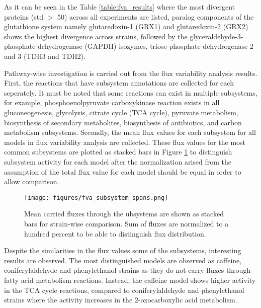   

As it can be seen in the Table \ref{table:fva_results} where the most divergent proteins (std $>$ 50) across all experiments are listed, paralog components of the glutathione system namely glutaredoxin-1 (GRX1) and glutaredoxin-2 (GRX2) shows the highest divergence across strains, followed by the glyceraldehyde-3-phosphate dehydrogenase (GAPDH) isozymes, triose-phosphate dehydrogenase 2 and 3 (TDH3 and TDH2).


Pathway-wise investigation is carried out from the flux variability analysis results. First, the reactions that have subsystem annotations are collected for each seperately. It must be noted that some reactions can exist in multiple subsystems, for example, phosphoenolpyruvate carboxykinase reaction exists in all gluconeogenesis, glycolysis, citrate cycle (TCA cycle), pyruvate metabolism, biosynthesis of secondary metabolites, biosynthesis of antibiotics, and carbon metabolism subsystems. Secondly, the mean flux values for each subsystem for all models in flux variability analysis are collected. These flux values for the most common subsystems are plotted as stacked bars in Figure \ref{fig:fva_subsystem_spans} to distinguish subsystem activity for each model after the normalization arised from the assumption of the total flux value for each model should be equal in order to allow comparison.

\begin{figure}[H]
  \begin{center}
  \texttt{[image: figures/fva\_subsystem\_spans.png]}
  \caption[Mean carried fluxes through the ubsystems are shown as stacked bars for strain-wise comparison. Sum of fluxes are normalized to a hundred percent to be able to distinguish flux distribution]{Mean carried fluxes through the ubsystems are shown as stacked bars for strain-wise comparison. Sum of fluxes are normalized to a hundred percent to be able to distinguish flux distribution.}
  \label{fig:fva_subsystem_spans}
  \end{center}
\end{figure}

Despite the similarities in the flux values some of the subsystems, interesting results are observed. The most distinguished models are observed as caffeine, coniferylaldehyde and phenylethanol strains as they do not carry fluxes through fatty acid metabolism reactions. Instead, the caffeine model shows higher activity in the TCA cycle reactions, compared to coniferylaldehyde and phenylethanol strains where the activity increases in the 2-oxocarboxylic acid metabolism.

